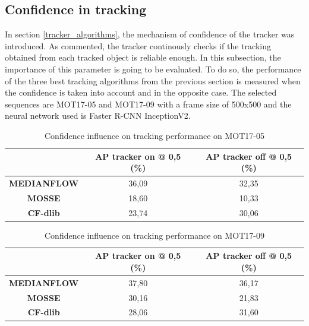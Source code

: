 \subsection{Confidence in tracking}
In section \ref{tracker_algorithms}, the mechanism of confidence of the tracker was introduced. As commented, the tracker continously checks if the tracking obtained from each tracked object is reliable enough. In this subsection, the importance of this parameter is going to be evaluated. To do so, the performance of the three best tracking algorithms from the previous section is measured when the confidence is taken into account and in the opposite case. The selected sequences are MOT17-05 and MOT17-09 with a frame size of 500x500 and the neural network used is Faster R-CNN InceptionV2.\\
\begin{table}[H]
\scriptsize
\begin{center}
\begin{tabular}{|c|c|c|}
\hline
\textbf{}           & \textbf{AP tracker on @ 0,5 (\%)} & \textbf{AP tracker off @ 0,5 (\%)} \\ \hline
\textbf{MEDIANFLOW} & 36,09                             & 32,35                              \\ \hline
\textbf{MOSSE}      & 18,60                             & 10,33                              \\ \hline
\textbf{CF-dlib}    & 23,74                             & 30,06                              \\ \hline
\end{tabular}
\end{center}
\caption{Confidence influence on tracking performance on MOT17-05}
\label{tab:tracker_exp_4}
\end{table}
\begin{table}[H]
\scriptsize
\begin{center}
\begin{tabular}{|c|c|c|}
\hline
\textbf{}           & \textbf{AP tracker on @ 0,5 (\%)} & \textbf{AP tracker off @ 0,5 (\%)} \\ \hline
\textbf{MEDIANFLOW} & 37,80                             & 36,17                              \\ \hline
\textbf{MOSSE}      & 30,16                             & 21,83                              \\ \hline
\textbf{CF-dlib}    & 28,06                             & 31,60                              \\ \hline
\end{tabular}
\end{center}
\caption{Confidence influence on tracking performance on MOT17-09}
\label{tab:tracker_exp_5}
\end{table}
